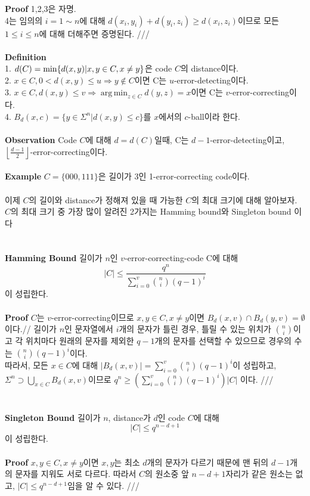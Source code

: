 \documentclass[11pt]{article}
\DeclareMathOperator*{\argmin}{arg\,min}
\begin{document}
{\bf Proof}
1,2,3은 자명.\\
4는 임의의 $i=1\sim n$에 대해 $d(x_{i},y_{i})+d(y_{i},z_{i})\geq d(x_{i},z_{i})$이므로 모든 $1\leq i\leq n$에 대해 더해주면 증명된다. ///\\\\
{\bf Definition}\\
1. $d(C) = \min\{d(x,y)\arrowvert x,y\in C, x\neq y\}$은 code $C$의 distance이다.\\
2. $x\in C, 0<d(x,y)\leq u \Rightarrow y\notin C$이면 C는 $u$-error-detecting이다. \\
3. $x\in C, d(x,y)\leq v \Rightarrow \argmin_{z\in C} d(y,z)=x$이면 C는 $v$-error-correcting이다.\\
4. $B_{d}(x,c)=\{y\in\Sigma^{n}\vert d(x,y)\leq c\}$를 $x$에서의 $c$-ball이라 한다.\\\\
{\bf Observation}
Code $C$에 대해 $d=d(C)$일때, C는 $d-1$-error-detecting이고, $\left\lfloor \frac{d-1}{2}\right\rfloor$-error-correcting이다.\\\\
\textbf{Example}
$C=\{000,111\}$은 길이가 3인 1-error-correcting code이다.\\\\
 이제 $C$의 길이와 distance가 정해져 있을 때 가능한 $C$의 최대 크기에 대해 알아보자. $C$의 최대 크기 중 가장 많이 알려진 2가지는 Hamming bound와 Singleton bound 이다\\\\\\
\textbf{Hamming Bound} 길이가 $n$인 $v$-error-correcting-code C에 대해 
\begin{displaymath}
\vert C\vert \leq \frac{q^{n}}{\sum_{i=0}^{v} \binom{n}{i}(q-1)^{i}}
\end{displaymath}
이 성립한다.\\\\
\textbf {Proof}
$C$는 $v$-error-correcting이므로 $x,y\in C, x\neq y$이면 $B_{d}(x,v)\cap B_{d}(y,v) = \emptyset$이다.//
 길이가 $n$인 문자열에서 $i$개의 문자가 틀린 경우, 틀릴 수 있는 위치가 $\binom{n}{i}$이고 각 위치마다 원래의 문자를 제외한 $q-1$개의 문자를 선택할 수 있으므로 경우의 수는 $\binom{n}{i}(q-1)^{i}$이다.\\
 따라서, 모든 $x\in C$에 대해 $\vert B_{d}(x,v)\vert = \sum_{i=0}^{v} \binom{n}{i}(q-1)^{i}$이 성립하고, $\Sigma^{n} \supset \bigcup_{x\in C}B_{d}(x,v)$이므로 $q^{n}\geq \left( \sum_{i=0}^{v} \binom{n}{i}(q-1)^{i} \right)\vert C\vert$ 이다. ///\\\\\\
 {\bf Singleton Bound} 길이가 $n$, distance가 $d$인 code $C$에 대해
 \begin{displaymath}
\vert C\vert \leq q^{n-d+1}
\end{displaymath}
이 성립한다.\\\\
{\bf Proof}
$x,y\in C, x\neq y$이면 $x,y$는 최소 $d$개의 문자가 다르기 때문에 맨 뒤의 $d-1$개의 문자를 지워도 서로 다르다. 따라서 $C$의 원소중 앞 $n-d+1$자리가 같은 원소는 없고, $\vert C\vert \leq q^{n-d+1}$임을 알 수 있다. ///
\end{document}
